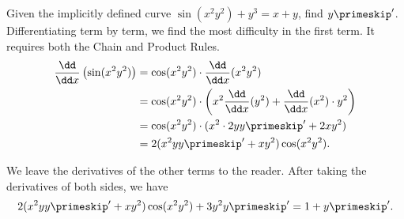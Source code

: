 \begin{example}\label{ex_implicit5}%
Given the implicitly defined curve $\sin(x^2y^2)+y^3=x+y$, find $y\primeskip'$.
\solution
Differentiating term by term, we find the most difficulty in the first term.  It requires both the Chain and Product Rules.
\begin{align*}
	\frac{\dd}{\dd x}\left(\sin (x^2y^2)\right)
	&= \cos(x^2y^2) \cdot \frac{\dd}{\dd x} (x^2y^2)\\
	&= \cos(x^2y^2) \cdot \left(x^2 \frac{\dd}{\dd x} (y^2)
	+ \frac{\dd}{\dd x} (x^2) \cdot y^2\right)\\
	&= \cos(x^2y^2) \cdot (x^2 \cdot 2yy\primeskip'+2xy^2)\\
	&= 2(x^2yy\primeskip'+xy^2)\cos(x^2y^2). \\
\end{align*}

We leave the derivatives of the other terms to the reader. After taking the derivatives of both sides, we have
\[2(x^2yy\primeskip'+xy^2)\cos(x^2y^2) + 3y^2y\primeskip' = 1 + y\primeskip'.\]


\end{example}
